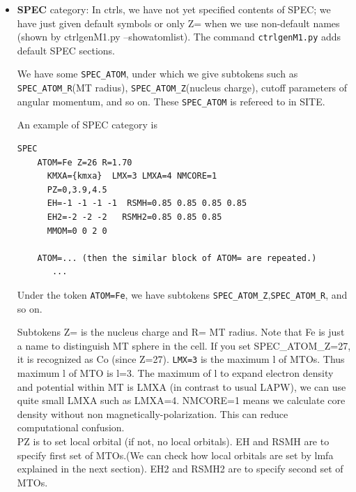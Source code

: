{\begin{itemize}
The SITE\_ATOM=foobar (with same foobar with different POS) are not
necessarily equivalent with respect to the space group operation of a system.
Thus \verb+SITE_ATOM=foobar+ are divided into ``classes'' which are
connected by the operation. 
The lmf automatically judge ``classes'' (see also info by lmchk). 
Thus not need to specify it, but it may be better to check it.
A sample is \verb+lmchk lagao+ at \verb+~/ecalj/lm7K/TESTsamples/LaGaO_relax+

\item
{\bf SPEC} category: 
In ctrls, we have not yet specified contents of SPEC; 
we have just given default symbols or only Z= when we use non-default
names (shown by ctrlgenM1.py --showatomlist).
The command \verb+ctrlgenM1.py+ adds default SPEC sections.

We have some \verb+SPEC_ATOM+, 
under which we give subtokens such as
\verb+SPEC_ATOM_R+(MT radius), \verb+SPEC_ATOM_Z+(nucleus charge), 
cutoff parameters of angular momentum, and so on. 
These \verb+SPEC_ATOM+ is refereed to in SITE.

An example of SPEC category is
\begin{verbatim}
SPEC                                                            
    ATOM=Fe Z=26 R=1.70 
      KMXA={kmxa}  LMX=3 LMXA=4 NMCORE=1                        
      PZ=0,3.9,4.5
      EH=-1 -1 -1 -1  RSMH=0.85 0.85 0.85 0.85          
      EH2=-2 -2 -2   RSMH2=0.85 0.85 0.85
      MMOM=0 0 2 0                                                    
  
    ATOM=... (then the similar block of ATOM= are repeated.)
       ...
\end{verbatim}
Under the token \verb+ATOM=Fe+, we have subtokens
\verb+SPEC_ATOM_Z+,\verb+SPEC_ATOM_R+, and so on.

Subtokens Z= is the nucleus charge and R= MT radius.
Note that Fe is just a name to distinguish MT sphere in the cell.
If you set SPEC\_ATOM\_Z=27, it is recognized as Co (since Z=27). 
\verb+LMX=3+ is the maximum l of MTOs. Thus maximum l of MTO is l=3.
The maximum of l to expand electron density and potential within MT is
LMXA (in contrast to usual LAPW), we can use quite small LMXA such as
LMXA=4. NMCORE=1 means we calculate core density without non magnetically-polarization.
This can reduce computational confusion.\\

PZ is to set local orbital (if not, no local orbitals). EH and RSMH are
to specify first set of MTOs.(We can check how local orbitals are 
set by lmfa explained in the next section).
EH2 and RSMH2 are to specify second set of MTOs. \\


\end{itemize}}
